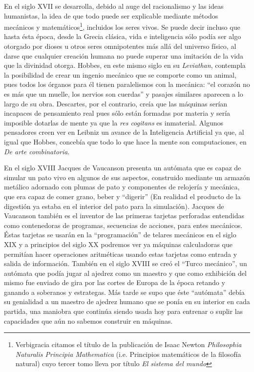 \documentclass[12pt]{memoir}
\begin{document}
En el siglo XVII se desarrolla, debido al auge del racionalismo y las ideas humanistas, la idea de que todo puede ser explicable mediante métodos mecánicos y matemáticos\footnote{Verbigracia citamos el título de la publicación de Isaac Newton \textit{Philosophia Naturalis Principia Mathematica} (i.e. Principios matemáticos de la filosofía natural) cuyo tercer tomo lleva por título \textit{El sistema del mundo}}, incluidos los seres vivos. Se puede decir incluso que hasta ésta época, desde la Grecia clásica, vida e inteligencia sólo podía ser algo otorgado por dioses u otros seres omnipotentes más allá del universo físico, al darse que cualquier creación humana no puede superar una imitación de la vida que la divinidad otorga. Hobbes, en este mismo siglo en su \textit{Leviathan}, contempla la posibilidad de crear un ingenio mecánico que se comporte como un animal, pues todos los órganos para él tienen paralelismos con la mecánica: ``el corazón no es más que un muelle, los nervios son cuerdas'' y pasajes similares aparecen a lo largo de su obra. Descartes, por el contrario, creía que las máquinas serían incapaces de pensamiento real pues sólo están formadas por materia y sería imposible dotarlas de mente ya que la \textit{res cogitans} es inmaterial. Algunos pensadores creen ver en Leibniz un avance de la Inteligencia Artificial ya que, al igual que Hobbes, concebía que todo lo que hace la mente son computaciones, en \textit{De arte combinatoria}. 

En el siglo XVIII Jacques de Vaucanson presenta un autómata que es capaz de simular un pato vivo en algunos de sus aspectos, construido mediante un armazón metálico adornado con plumas de pato y componentes de relojería y mecánica, que era capaz de comer grano, beber y ``digerir'' (En realidad el producto de la digestión ya estaba en el interior del pato para la simulación). Jacques de Vaucanson también es el inventor de las primeras tarjetas perforadas entendidas como contenedoras de programas, secuencias de acciones, para entes mecánicos. Éstas tarjetas se usarán en la ``programación'' de telares mecánicos en el siglo XIX y a principios del siglo XX podremos ver ya máquinas calculadoras que permitían hacer operaciones aritméticas usando estas tarjetas como entrada y salida de información. También en el siglo XVIII se creó el ``Turco mecánico'', un autómata que podía jugar al ajedrez como un maestro y que como exhibición del mismo fue enviado de gira por las cortes de Europa de la época retando y ganando a soberanos y estrategas. Más tarde se supo que éste ``autómata'' debía su genialidad a un maestro de ajedrez humano que se ponía en su interior en cada partida, una maniobra que continúa siendo usada hoy para entrenar o suplir las capacidades que aún no sabemos construir en máquinas.
\end{document}
